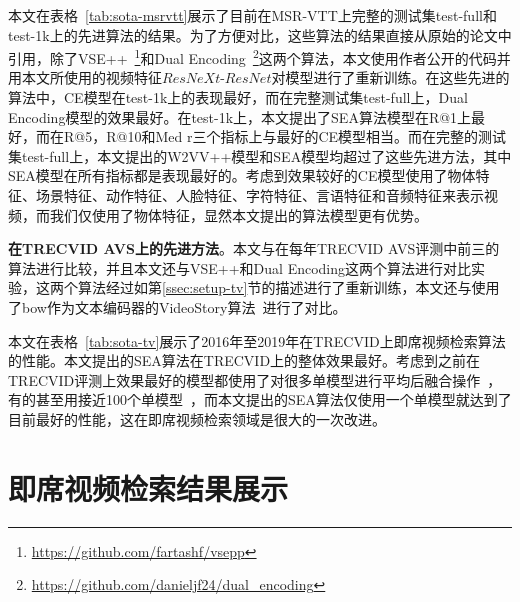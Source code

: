 本文在表格~\ref{tab:sota-msrvtt}展示了目前在MSR-VTT上完整的测试集test-full和test-1k上的先进算法的结果。为了方便对比，这些算法的结果直接从原始的论文中引用，除了VSE++~\footnote{\url{https://github.com/fartashf/vsepp}}和Dual Encoding~\footnote{\url{https://github.com/danieljf24/dual_encoding}}这两个算法，本文使用作者公开的代码并用本文所使用的视频特征$ResNeXt$-$ResNet$对模型进行了重新训练。在这些先进的算法中，CE模型在test-1k上的表现最好，而在完整测试集test-full上，Dual Encoding模型的效果最好。在test-1k上，本文提出了SEA算法模型在R@1上最好，而在R@5，R@10和Med r三个指标上与最好的CE模型相当。而在完整的测试集test-full上，本文提出的W2VV++模型和SEA模型均超过了这些先进方法，其中SEA模型在所有指标都是表现最好的。考虑到效果较好的CE模型使用了物体特征、场景特征、动作特征、人脸特征、字符特征、言语特征和音频特征来表示视频，而我们仅使用了物体特征，显然本文提出的算法模型更有优势。



\textbf{在TRECVID AVS上的先进方法}。本文与在每年TRECVID AVS评测中前三的算法进行比较，并且本文还与VSE++和Dual Encoding这两个算法进行对比实验，这两个算法经过如第\ref{ssec:setup-tv}节的描述进行了重新训练，本文还与使用了bow作为文本编码器的VideoStory算法~\cite{habibian2017video2vec}进行了对比。

本文在表格~\ref{tab:sota-tv}展示了2016年至2019年在TRECVID上即席视频检索算法的性能。本文提出的SEA算法在TRECVID上的整体效果最好。考虑到之前在TRECVID评测上效果最好的模型都使用了对很多单模型进行平均后融合操作~\cite{snoek2017university,li2018renmin,wu2019hybrid}，有的甚至用接近100个单模型~\cite{ueki2019waseda}，而本文提出的SEA算法仅使用一个单模型就达到了目前最好的性能，这在即席视频检索领域是很大的一次改进。




\section{即席视频检索结果展示}

